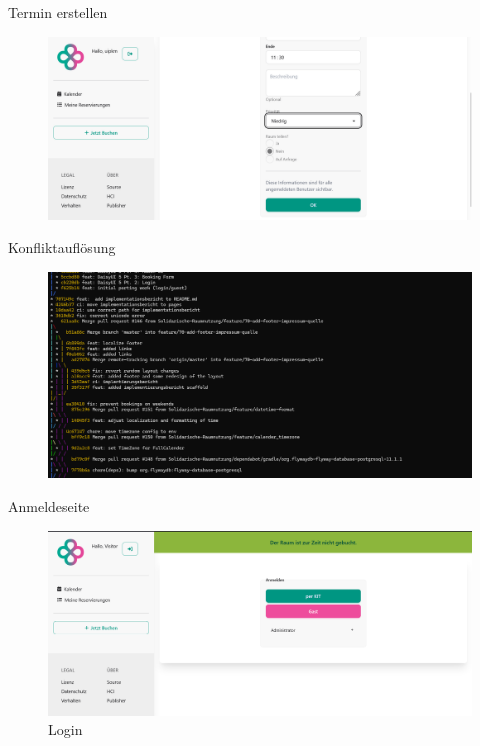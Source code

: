 \begin{frame}{Termin erstellen}
    \thispagestyle{plain}
    \begin{figure}
        \centering
        \includegraphics[width=1\linewidth]{pictures/bookings_create_form_2.png}
        \label{fig:enter-label}
    \end{figure}
\end{frame}

\begin{frame}{Konfliktauflösung}
    \thispagestyle{plain}
    \begin{figure}
        \centering
        \includegraphics[width=1\linewidth]{pictures/image.png}
        
        \label{fig:enter-label}
    \end{figure}
\end{frame}

\begin{frame}{Anmeldeseite}
    \thispagestyle{plain}
    \begin{figure}
        \centering
        \includegraphics[width=1\linewidth]{pictures/auth_login.png}
        \caption{Login}
        \label{fig:enter-label}
    \end{figure}
\end{frame}

